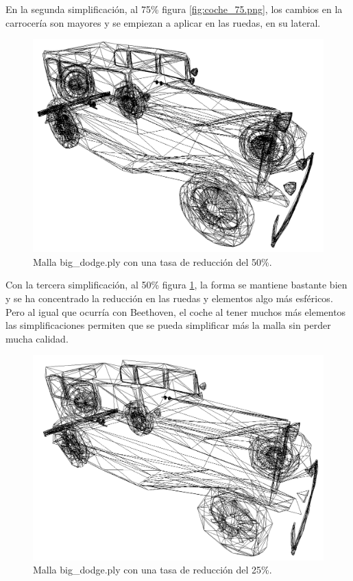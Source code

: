En la segunda simplificación, al 75\% figura \ref{fig:coche_75.png}, los cambios en la carrocería son mayores y se empiezan a aplicar en las ruedas, en su lateral.\\

\begin{figure} %
	\centering
	\includegraphics[scale=0.25]{imagenes/coche_50.png} 
	\caption{Malla big\_dodge.ply con una tasa de reducción del 50\%.} \label{fig:coche_50.png}
\end{figure}

Con la tercera simplificación, al 50\% figura \ref{fig:coche_50.png}, la forma se mantiene bastante bien y se ha concentrado la reducción en las ruedas y elementos algo más esféricos. Pero al igual que ocurría con Beethoven, el coche al tener muchos más elementos las simplificaciones permiten que se pueda simplificar más la malla sin perder mucha calidad.\\

\begin{figure} %
	\centering
	\includegraphics[scale=0.25]{imagenes/coche_25.png} 
	\caption{Malla big\_dodge.ply con una tasa de reducción del 25\%.} \label{fig:coche_25.png}
\end{figure}

